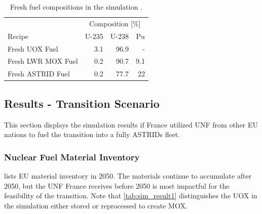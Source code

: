 \documentclass{article}
\begin{document}
\begin{table}[h]
    \centering
    \caption{Fresh fuel compositions in the simulation \cite{wilson_adoption_2009, varaine_pre-conceptual_2012}.}
        \begin{tabular}{lrrr}
            \hline
             & \multicolumn{3}{c}{ Composition [\%]} \\
            Recipe & U-235  & U-238  & Pu \\ 
            \hline
            Fresh \gls{UOX} Fuel & 3.1 & 96.9 & -   \\ 
            Fresh \gls{LWR} \gls{MOX} Fuel & 0.2 & 90.7 & 9.1 \\ 
            Fresh \gls{ASTRID} Fuel & 0.2 & 77.7 & 22 \\
            \hline
        \end{tabular}
        
        \label{tab:sim_result}
\end {table}



\subsection{Results - Transition Scenario}
This section displays the simulation results if France utilized
\gls{UNF} from other \gls{EU} nations to fuel the transition into a fully
\glspl{ASTRID} fleet.

\subsubsection{Nuclear Fuel Material Inventory}
lists \gls{EU} material inventory in 2050.
The materials continue to accumulate after 2050, but the
\gls{UNF} France receives before 2050 is most impactful for the
feasibility of the transition. Note that \cref{tab:sim_result1} 
distinguishes the
\gls{UOX} in the simulation either stored or reprocessed to create \gls{MOX}.
\end{document}
